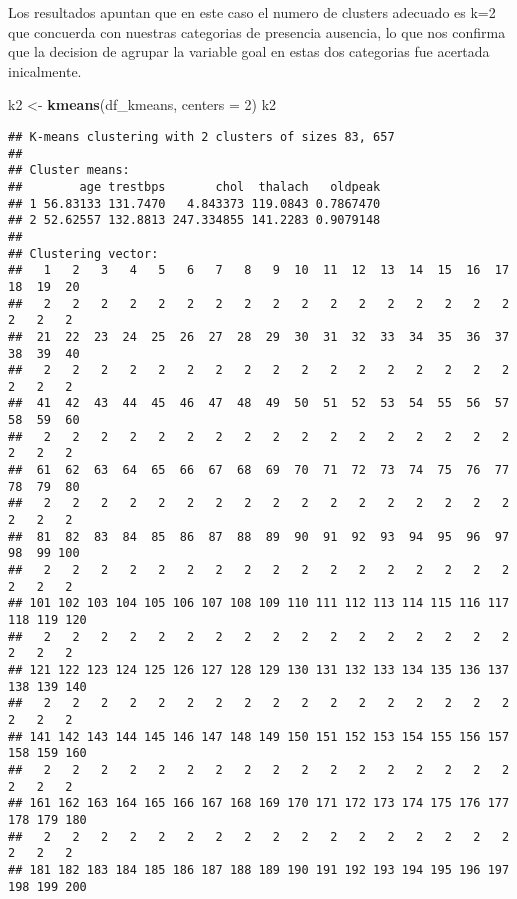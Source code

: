 \documentclass[
]{article}
\newenvironment{Shaded}{\begin{snugshade}}{\end{snugshade}}
\newcommand{\DataTypeTok}[1]{\textcolor[rgb]{0.13,0.29,0.53}{#1}}
\newcommand{\DecValTok}[1]{\textcolor[rgb]{0.00,0.00,0.81}{#1}}
\newcommand{\KeywordTok}[1]{\textcolor[rgb]{0.13,0.29,0.53}{\textbf{#1}}}
\newcommand{\NormalTok}[1]{#1}
\newcommand{\StringTok}[1]{\textcolor[rgb]{0.31,0.60,0.02}{#1}}
\begin{document}
Los resultados apuntan que en este caso el numero de clusters adecuado
es k=2 que concuerda con nuestras categorias de presencia ausencia, lo
que nos confirma que la decision de agrupar la variable goal en estas
dos categorias fue acertada inicalmente.

\begin{Shaded}
\begin{Highlighting}[]
\NormalTok{k2 <-}\StringTok{ }\KeywordTok{kmeans}\NormalTok{(df_kmeans, }\DataTypeTok{centers =} \DecValTok{2}\NormalTok{)}
\NormalTok{k2}
\end{Highlighting}
\end{Shaded}

\begin{verbatim}
## K-means clustering with 2 clusters of sizes 83, 657
## 
## Cluster means:
##        age trestbps       chol  thalach   oldpeak
## 1 56.83133 131.7470   4.843373 119.0843 0.7867470
## 2 52.62557 132.8813 247.334855 141.2283 0.9079148
## 
## Clustering vector:
##   1   2   3   4   5   6   7   8   9  10  11  12  13  14  15  16  17  18  19  20 
##   2   2   2   2   2   2   2   2   2   2   2   2   2   2   2   2   2   2   2   2 
##  21  22  23  24  25  26  27  28  29  30  31  32  33  34  35  36  37  38  39  40 
##   2   2   2   2   2   2   2   2   2   2   2   2   2   2   2   2   2   2   2   2 
##  41  42  43  44  45  46  47  48  49  50  51  52  53  54  55  56  57  58  59  60 
##   2   2   2   2   2   2   2   2   2   2   2   2   2   2   2   2   2   2   2   2 
##  61  62  63  64  65  66  67  68  69  70  71  72  73  74  75  76  77  78  79  80 
##   2   2   2   2   2   2   2   2   2   2   2   2   2   2   2   2   2   2   2   2 
##  81  82  83  84  85  86  87  88  89  90  91  92  93  94  95  96  97  98  99 100 
##   2   2   2   2   2   2   2   2   2   2   2   2   2   2   2   2   2   2   2   2 
## 101 102 103 104 105 106 107 108 109 110 111 112 113 114 115 116 117 118 119 120 
##   2   2   2   2   2   2   2   2   2   2   2   2   2   2   2   2   2   2   2   2 
## 121 122 123 124 125 126 127 128 129 130 131 132 133 134 135 136 137 138 139 140 
##   2   2   2   2   2   2   2   2   2   2   2   2   2   2   2   2   2   2   2   2 
## 141 142 143 144 145 146 147 148 149 150 151 152 153 154 155 156 157 158 159 160 
##   2   2   2   2   2   2   2   2   2   2   2   2   2   2   2   2   2   2   2   2 
## 161 162 163 164 165 166 167 168 169 170 171 172 173 174 175 176 177 178 179 180 
##   2   2   2   2   2   2   2   2   2   2   2   2   2   2   2   2   2   2   2   2 
## 181 182 183 184 185 186 187 188 189 190 191 192 193 194 195 196 197 198 199 200 

\end{verbatim}
\end{document}
